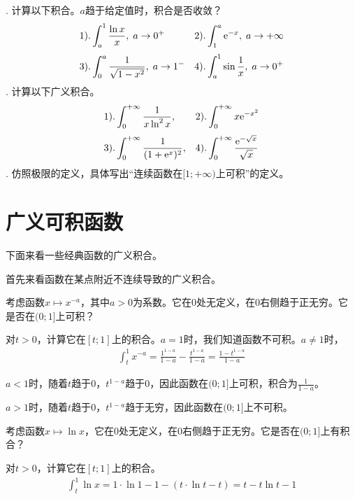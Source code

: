 \documentclass[12pt,UTF8]{ctexbook}
\begin{document}
\begin{xt}
    . 计算以下积合。$a$趋于给定值时，积合是否收敛？\\    
    \begin{align*}
        1).& \int_a^{1} \frac{\ln{x}}{x} , \; a\to 0^+  &2).& \int_1^{a} \mathrm{e}^{-x},  \; a\to +\infty \\[3pt]
        3).& \int_0^{a} \frac{1}{\sqrt{1 - x^2}}, \; a\to 1^-   & 4).& \int_a^{1} \sin{\frac{1}{x}}, \; a\to 0^+ 
    \end{align*}
    . 计算以下广义积合。\\    
    \begin{align*}
        1).& \int_0^{+\infty} \frac{1}{x\ln^2{x}} ,  &2).& \int_0^{+\infty} x\mathrm{e}^{-x^2} \\[3pt]
        3).& \int_0^{+\infty} \frac{1}{(1 + \mathrm{e}^{x})^2},  & 4).& \int_0^{+\infty} \frac{\mathrm{e}^{-\sqrt{x}}}{\sqrt{x}}
    \end{align*}
    . 仿照极限的定义，具体写出“连续函数在$[1;+\infty)$上可积”的定义。\\

\end{xt}

\section{广义可积函数}

下面来看一些经典函数的广义积合。

首先来看函数在某点附近不连续导致的广义积合。

考虑函数$x\mapsto x^{-a}$，其中$a>0$为系数。它在$0$处无定义，在$0$右侧趋于正无穷。它是否在$(0;1]$上可积？

对$t>0$，计算它在$[t;1]$上的积合。$a=1$时，我们知道函数不可积。$a\neq 1$时，
\begin{align*}
    \int_t^1 x^{-a} = \frac{1^{1-a}}{1 - a} - \frac{t^{1-a}}{1 - a} = \frac{1 - t^{1-a}}{1-a} 
\end{align*}

$a<1$时，随着$t$趋于$0$，$t^{1-a}$趋于$0$，因此函数在$(0;1]$上可积，积合为$\frac{1}{1-a}$。

$a>1$时，随着$t$趋于$0$，$t^{1-a}$趋于无穷，因此函数在$(0;1]$上不可积。

考虑函数$x\mapsto \ln{x}$，它在$0$处无定义，在$0$右侧趋于正无穷。它是否在$(0;1]$上有积合？

对$t>0$，计算它在$[t;1]$上的积合。
\begin{align*}
    \int_t^1 \ln{x} = 1\cdot \ln{1} - 1 - (t\cdot\ln{t} - t)= t - t\ln{t} - 1
\end{align*}
\end{document}
